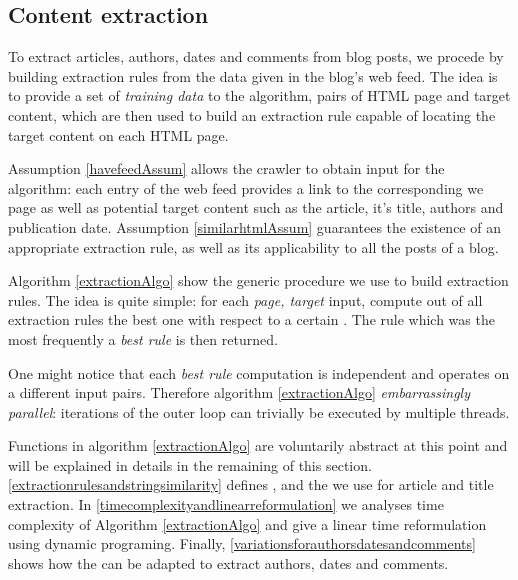 \subsection{Content extraction}
\label{contentextraction}

To extract articles, authors, dates and comments from blog posts, we procede by building extraction rules from the data given in the blog's web feed. The idea is to provide a set of \emph{training data} to the algorithm, pairs of HTML page and target content, which are then used to build an extraction rule capable of locating the target content on each HTML page.

Assumption \ref{havefeedAssum} allows the crawler to obtain input for the algorithm: each entry of the web feed provides a link to the corresponding we page as well as potential target content such as the article, it's title, authors and publication date. Assumption \ref{similarhtmlAssum} guarantees the existence of an appropriate extraction rule, as well as its applicability to all the posts of a blog.

Algorithm \ref{extractionAlgo} show the generic procedure we use to build extraction rules. The idea is quite simple: for each \code{(}\emph{page, target}\code{)} input, compute out of all extraction rules the best one with respect to a certain . The rule which was the most frequently a \emph{best rule} is then returned.

\extractionAlgo

One might notice that each \emph{best rule} computation is independent and operates on a different input pairs. Therefore algorithm \ref{extractionAlgo} \emph{embarrassingly parallel}: iterations of the outer loop can trivially be executed by multiple threads.

Functions in algorithm \ref{extractionAlgo} are voluntarily abstract at this point and will be explained in details in the remaining of this section. \ref{extractionrulesandstringsimilarity} defines ,  and the  we use for article and title extraction. In \ref{timecomplexityandlinearreformulation} we analyses time complexity of Algorithm \ref{extractionAlgo} and give a linear time reformulation using dynamic programing. Finally, \ref{variationsforauthorsdatesandcomments} shows how the  can be adapted to extract authors, dates and comments.

